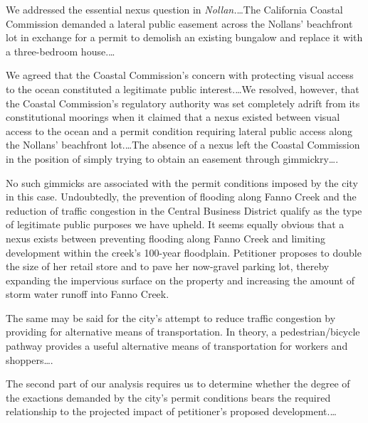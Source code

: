 
We addressed the essential nexus question in \textit{Nollan.}\ldots The
California Coastal Commission demanded a lateral public easement across the
Nollans' beachfront lot in exchange for a permit to demolish an existing
bungalow and replace it with a three-bedroom house.\ldots

We agreed that the Coastal Commission's concern with protecting visual access to
the ocean constituted a legitimate public interest.\ldots We resolved, however,
that the Coastal Commission's regulatory authority was set completely adrift
from its constitutional moorings when it claimed that a nexus existed between
visual access to the ocean and a permit condition requiring lateral public
access along the Nollans' beachfront lot.\ldots The absence of a nexus left the
Coastal Commission in the position of simply trying to obtain an easement
through gimmickry\ldots.

No such gimmicks are associated with the permit conditions imposed by the city
in this case. Undoubtedly, the prevention of flooding along Fanno Creek and the
reduction of traffic congestion in the Central Business District qualify as the
type of legitimate public purposes we have upheld. It seems equally obvious that
a nexus exists between preventing flooding along Fanno Creek and limiting
development within the creek's 100-year floodplain. Petitioner proposes to
double the size of her retail store and to pave her now-gravel parking lot,
thereby expanding the impervious surface on the property and increasing the
amount of storm water runoff into Fanno Creek.

The same may be said for the city's attempt to reduce traffic congestion by
providing for alternative means of transportation. In theory, a
pedestrian/bicycle pathway provides a useful alternative means of transportation
for workers and shoppers\ldots.



The second part of our analysis requires us to determine whether the degree of
the exactions demanded by the city's permit conditions bears the required
relationship to the projected impact of petitioner's proposed development.\ldots



